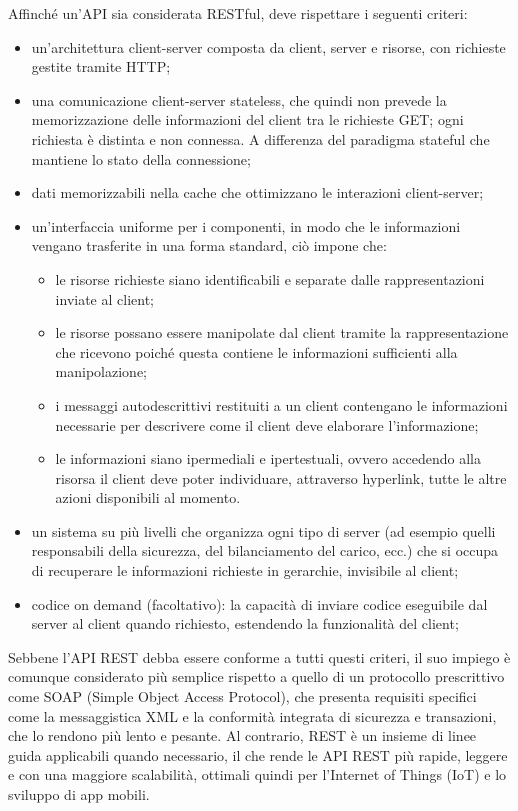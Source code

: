 \documentclass[12pt,a4paper]{article}
\begin{document}
Affinché un'API sia considerata RESTful, deve rispettare i seguenti criteri:
\begin{itemize}
    \item un'architettura client-server composta da client, server e risorse, con richieste gestite tramite HTTP;
    \item una comunicazione client-server stateless, che quindi non prevede la memorizzazione delle informazioni del client tra le richieste GET; ogni richiesta è distinta e non connessa. A differenza del paradigma stateful che mantiene lo stato della connessione;
    \item dati memorizzabili nella cache che ottimizzano le interazioni client-server;
    \item un'interfaccia uniforme per i componenti, in modo che le informazioni vengano trasferite in una forma standard, ciò impone che:
        \begin{itemize}
            \item le risorse richieste siano identificabili e separate dalle rappresentazioni inviate al client;
            \item le risorse possano essere manipolate dal client tramite la rappresentazione che ricevono poiché questa contiene le informazioni sufficienti alla manipolazione;
            \item i messaggi autodescrittivi restituiti a un client contengano le informazioni necessarie per descrivere come il client deve elaborare l'informazione;
            \item le informazioni siano ipermediali e ipertestuali, ovvero accedendo alla risorsa il client deve poter individuare, attraverso hyperlink, tutte le altre azioni disponibili al momento.
        \end{itemize}
    \item un sistema su più livelli che organizza ogni tipo di server (ad esempio quelli responsabili della sicurezza, del bilanciamento del carico, ecc.) che si occupa di recuperare le informazioni richieste in gerarchie, invisibile al client;
    \item codice on demand (facoltativo): la capacità di inviare codice eseguibile dal server al client quando richiesto, estendendo la funzionalità del client;
\end{itemize}

Sebbene l'API REST debba essere conforme a tutti questi criteri, il suo impiego è comunque considerato più semplice rispetto a quello di un protocollo prescrittivo come SOAP (Simple Object Access Protocol), che presenta requisiti specifici come la messaggistica XML e la conformità integrata di sicurezza e transazioni, che lo rendono più lento e pesante.
Al contrario, REST è un insieme di linee guida applicabili quando necessario, il che rende le API REST più rapide, leggere e con una maggiore scalabilità, ottimali quindi per l'Internet of Things (IoT) e lo sviluppo di app mobili.
\end{document}
